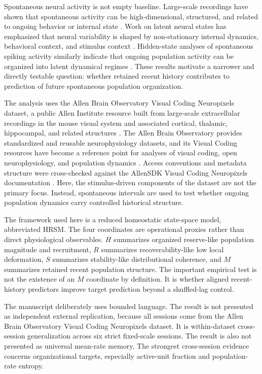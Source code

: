 \documentclass[11pt]{article}
\begin{document}
Spontaneous neural activity is not empty baseline. Large-scale recordings have shown that spontaneous activity can be high-dimensional, structured, and related to ongoing behavior or internal state \citep{Stringer2019Spontaneous}. Work on latent neural states has emphasized that neural variability is shaped by non-stationary internal dynamics, behavioral context, and stimulus context \citep{Akella2025LatentStates}. Hidden-state analyses of spontaneous spiking activity similarly indicate that ongoing population activity can be organized into latent dynamical regimes \citep{Sederberg2024LatentDynamics}. These results motivate a narrower and directly testable question: whether retained recent history contributes to prediction of future spontaneous population organization.

The analysis uses the Allen Brain Observatory Visual Coding Neuropixels dataset, a public Allen Institute resource built from large-scale extracellular recordings in the mouse visual system and associated cortical, thalamic, hippocampal, and related structures \citep{AllenBrainObservatoryVisualCodingNeuropixels,Jun2017Neuropixels,Siegle2021VisualHierarchy}. The Allen Brain Observatory provides standardized and reusable neurophysiology datasets, and its Visual Coding resources have become a reference point for analyses of visual coding, open neurophysiology, and population dynamics \citep{DeVries2023AllenLessons,Xie2023VisualCodingAssessment}. Access conventions and metadata structure were cross-checked against the AllenSDK Visual Coding Neuropixels documentation \citep{AllenSDKVisualCodingNeuropixels}. Here, the stimulus-driven components of the dataset are not the primary focus. Instead, spontaneous intervals are used to test whether ongoing population dynamics carry controlled historical structure.

The framework used here is a reduced homeostatic state-space model, abbreviated HRSM. The four coordinates are operational proxies rather than direct physiological observables. \(H\) summarizes organized reserve-like population magnitude and recruitment, \(R\) summarizes recoverability-like low local deformation, \(S\) summarizes stability-like distributional coherence, and \(M\) summarizes retained recent population structure. The important empirical test is not the existence of an \(M\) coordinate by definition. It is whether aligned recent-history predictors improve target prediction beyond a shuffled-lag control.

The manuscript deliberately uses bounded language. The result is not presented as independent external replication, because all sessions come from the Allen Brain Observatory Visual Coding Neuropixels dataset. It is within-dataset cross-session generalization across six strict fixed-scale sessions. The result is also not presented as universal mean-rate memory. The strongest cross-session evidence concerns organizational targets, especially active-unit fraction and population-rate entropy.
\end{document}
